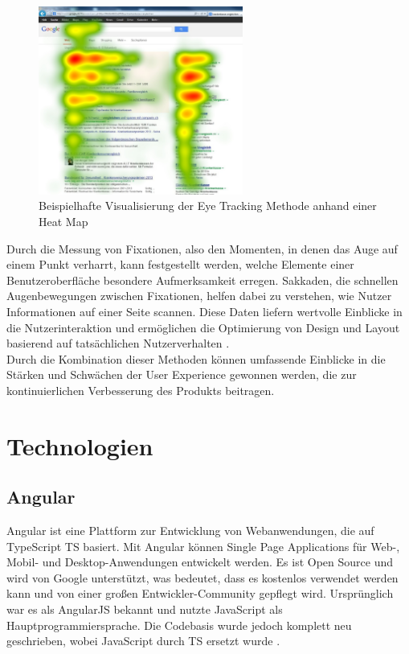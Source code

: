 \begin{figure}[h]
	\centering
	\includegraphics[width=0.6\textwidth]{images/Eye-Tracking-Google-Search-Heat-Map.jpg}
	\caption[Beispielhafte Visualisierung der Eye Tracking Methode anhand einer Heat Map]{Beispielhafte Visualisierung der Eye Tracking Methode anhand einer Heat Map \cite{image_eye_tracking}}
	\label{fig:eye_tracking}
\end{figure}

Durch die Messung von Fixationen, also den Momenten, in denen das Auge auf einem Punkt verharrt, kann festgestellt werden, welche Elemente einer Benutzeroberfläche besondere Aufmerksamkeit erregen. 
Sakkaden, die schnellen Augenbewegungen zwischen Fixationen, helfen dabei zu verstehen, wie Nutzer Informationen auf einer Seite scannen. 
Diese Daten liefern wertvolle Einblicke in die Nutzerinteraktion und ermöglichen die Optimierung von Design und Layout basierend auf tatsächlichen Nutzerverhalten \cite[S.3 ff.]{eye_tracking}.\\
Durch die Kombination dieser Methoden können umfassende Einblicke in die Stärken und Schwächen der User Experience gewonnen werden, die zur kontinuierlichen Verbesserung des Produkts beitragen.

\section{Technologien}
\subsection{Angular}
Angular ist eine Plattform zur Entwicklung von Webanwendungen, die auf TypeScript \ac{TS} basiert. 
Mit Angular können Single Page Applications für Web-, Mobil- und Desktop-Anwendungen entwickelt werden. 
Es ist Open Source und wird von Google unterstützt, was bedeutet, dass es kostenlos verwendet werden kann und von einer großen Entwickler-Community gepflegt wird. 
Ursprünglich war es als AngularJS bekannt und nutzte JavaScript als Hauptprogrammiersprache. Die Codebasis wurde jedoch komplett neu geschrieben, wobei JavaScript durch TS ersetzt wurde \cite{angular_arch}.\\

